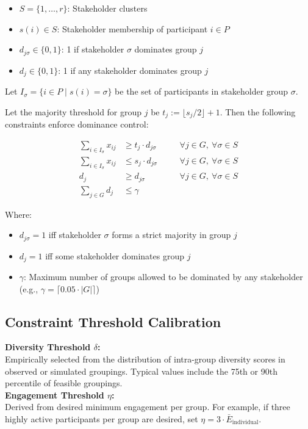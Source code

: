 \begin{itemize}
    \item $S = \{1, \dots, r\}$: Stakeholder clusters
    \item $s(i) \in S$: Stakeholder membership of participant $i \in P$
    \item $d_{j\sigma} \in \{0,1\}$: 1 if stakeholder $\sigma$ dominates group $j$
    \item $d_j \in \{0,1\}$: 1 if any stakeholder dominates group $j$
\end{itemize}

Let $I_\sigma = \{ i \in P \mid s(i) = \sigma \}$ be the set of participants in stakeholder group $\sigma$.

Let the majority threshold for group $j$ be $t_j := \lfloor s_j / 2 \rfloor + 1$.
Then the following constraints enforce dominance control:

\begin{align*}
\sum_{i \in I_\sigma} x_{ij} &\geq t_j \cdot d_{j\sigma} \quad &&\forall j \in G,\ \forall \sigma \in S \\
\sum_{i \in I_\sigma} x_{ij} &\leq s_j \cdot d_{j\sigma} \quad &&\forall j \in G,\ \forall \sigma \in S \\
d_j &\geq d_{j\sigma} \quad &&\forall j \in G,\ \forall \sigma \in S \\
\sum_{j \in G} d_j &\leq \gamma &&
\end{align*}

\noindent
Where:
\begin{itemize}
    \item $d_{j\sigma} = 1$ iff stakeholder $\sigma$ forms a strict majority in group $j$
    \item $d_j = 1$ iff some stakeholder dominates group $j$
    \item $\gamma$: Maximum number of groups allowed to be dominated by any stakeholder (e.g., $\gamma = \lceil 0.05 \cdot |G| \rceil$)
\end{itemize}
\noindent
\subsection*{Constraint Threshold Calibration}
\textbf{Diversity Threshold \(\delta\):}\\[3pt]
Empirically selected from the distribution of intra-group diversity scores in observed or simulated groupings.
Typical values include the 75th or 90th percentile of feasible groupings.
\\
\noindent
\textbf{Engagement Threshold \(\eta\):}\\[3pt]
Derived from desired minimum engagement per group.
For example, if three highly active participants per group are desired,
set \(\eta = 3 \cdot \bar{E}_{\text{individual}}\).

